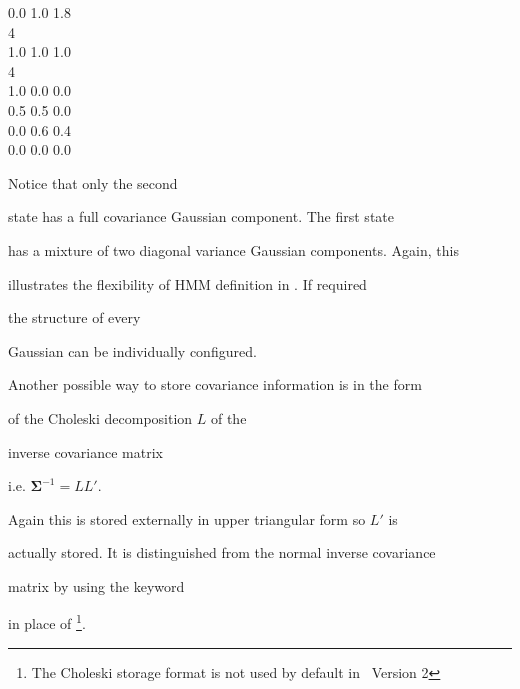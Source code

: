 {\>\>\> 0.0 1.0 1.8  \\


\>\>\>     4 \\


\>\>\> 1.0 1.0 1.0 \\ 


\>  4 \\


\> 1.0 0.0 0.0 \\


\> 0.5 0.5 0.0 \\


\> 0.0 0.6 0.4 \\


\> 0.0 0.0 0.0 \\




}{}





Notice that only the second


state has a full covariance Gaussian component.  The first state


has a mixture of two diagonal variance Gaussian components.  Again, this


illustrates the flexibility of HMM definition in \HTK.  If required


the structure of every


Gaussian can be individually configured.





Another possible way to store covariance information is in the form


of the Choleski decomposition $L$ of the 


inverse covariance matrix


i.e. $\bm{\Sigma}^{-1} = LL'$.


Again this is stored externally in upper triangular form so $L'$ is


actually stored.  It is distinguished from the normal inverse covariance


matrix by using the keyword  


in place of \footnote{


The Choleski storage format is not used by default in \HTK\ Version 2}.  








